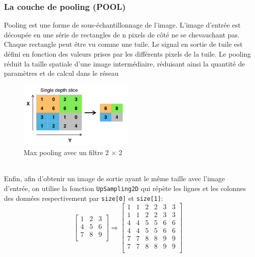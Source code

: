 \documentclass[12pt,a4paper]{article}
\begin{document}
\subsubsection{La couche de pooling (POOL)}
Pooling est une forme de sous-échantillonnage de l'image.
L'image d'entrée est découpée en une série de rectangles de n pixels de côté ne se chevauchant pas.
Chaque rectangle peut être vu comme une tuile.
Le signal en sortie de tuile est défini en fonction des valeurs prises par les différents pixels de la tuile.
Le pooling réduit la taille spatiale d'une image intermédiaire,
réduisant ainsi la quantité de paramètres et de calcul dans le réseau \cite{wiki-cnn}
\begin{figure}[h!]
  \centering
  \includegraphics[width=0.5\textwidth]{max_pooling.png}
  \caption{Max pooling avec un filtre 2 × 2}
  \label{fig:5}
\end{figure}
\\
Enfin, afin d'obtenir un image de sortie ayant le même taille avec l'image d'entrée,
on utilise la fonction \lstinline{UpSampling2D} qui répète les lignes et les colonnes des données
respectivement par \lstinline{size[0]} et \lstinline{size[1]}:
$$\begin{bmatrix}
  1 & 2 & 3\\
  4 & 5 & 6\\
  7 & 8 & 9\\
\end{bmatrix} \Rightarrow
\begin{bmatrix}
  1 & 1 & 2 & 2 & 3 & 3\\
  1 & 1 & 2 & 2 & 3 & 3\\
  4 & 4 & 5 & 5 & 6 & 6\\
  4 & 4 & 5 & 5 & 6 & 6\\
  7 & 7 & 8 & 8 & 9 & 9\\
  7 & 7 & 8 & 8 & 9 & 9\\
\end{bmatrix}
$$
\end{document}
